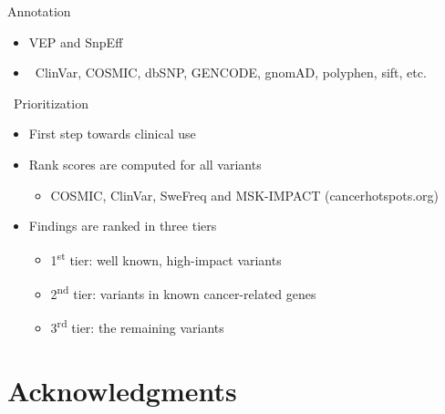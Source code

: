 \documentclass[usepdftitle=false]{beamer}
\newcommand{\ts}{\textsuperscript}
\begin{document}
\begin{frame}{Annotation}
	\begin{itemize}
		\item VEP and SnpEff
		\item \faDatabase\ ClinVar, COSMIC, dbSNP, GENCODE, gnomAD, polyphen, sift, etc.
	\end{itemize}
\end{frame}


\begin{frame}{\faWrench\ Prioritization}
	\begin{itemize}
		\item	First step towards clinical use
		\pause
		\item	Rank scores are computed for all variants
		\begin{itemize}
			\item	COSMIC, ClinVar, SweFreq and MSK-IMPACT (cancerhotspots.org)
		\end{itemize}
		\pause
		\item	Findings are ranked in three tiers
		\begin{itemize}
			\item	1\ts{st} tier: well known, high-impact variants
			\item	2\ts{nd} tier: variants in known cancer-related genes
			\item	3\ts{rd} tier: the remaining variants
		\end{itemize}
	\end{itemize}
\end{frame}

\section{Acknowledgments}
\end{document}
